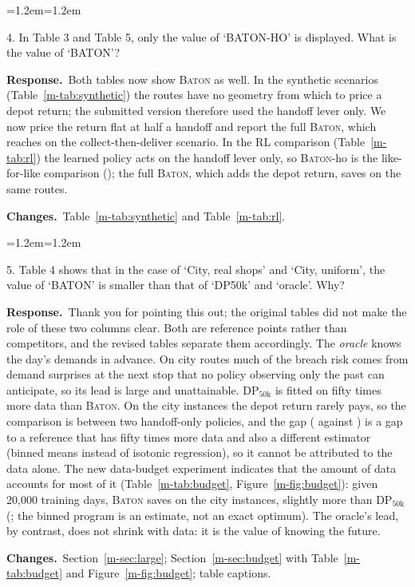 \documentclass[11pt]{article}
\newenvironment{comment}{\par\medskip\noindent\color{rev}\itshape
  \begin{list}{}{\leftmargin=1.2em\rightmargin=1.2em}\item[]}%
  {\end{list}\par}
\newcommand{\resp}{\par\noindent\textbf{Response.}\ }
\newcommand{\chg}{\par\noindent\textbf{Changes.}\ }
\newcommand{\sref}[1]{Section~\ref{m-#1}}
\newcommand{\tref}[1]{Table~\ref{m-#1}}
\newcommand{\fref}[1]{Figure~\ref{m-#1}}
\newcommand{\BATON}{\textsc{Baton}}
\begin{document}
\begin{comment}
4. In Table 3 and Table 5, only the value of `BATON-HO' is displayed.
What is the value of `BATON'?
\end{comment}
\resp Both tables now show \BATON{} as well. In the synthetic scenarios
(\tref{tab:synthetic}) the routes have no geometry from which to price a
depot return; the submitted version therefore used the handoff lever
only. We now price the return flat at half a handoff and report the full
\BATON, which reaches \ctdBatonFull{} on the collect-then-deliver
scenario. In the RL comparison (\tref{tab:rl}) the learned policy acts
on the handoff lever only, so \BATON-ho is the like-for-like comparison
(\rlBatonHo); the full \BATON, which adds the depot return, saves
\rlBaton{} on the same routes.
\chg \tref{tab:synthetic} and \tref{tab:rl}.

\begin{comment}
5. Table 4 shows that in the case of `City, real shops' and `City,
uniform', the value of `BATON' is smaller than that of `DP50k' and
`oracle'. Why?
\end{comment}
\resp Thank you for pointing this out; the original tables did not make
the role of these two columns clear. Both are reference points rather
than competitors, and the revised tables separate them accordingly. The
\emph{oracle} knows the day's demands in advance. On city routes much of
the breach risk comes from demand surprises at the next stop that no
policy observing only the past can anticipate, so its lead is large and
unattainable. DP$_{50\mathrm{k}}$ is fitted on fifty times more data
than \BATON. On the city instances the depot return rarely pays, so the
comparison is between two handoff-only policies, and the gap
(\svCityBaton{} against \svCityDp) is a gap to a reference that has
fifty times more data and also a different estimator (binned means
instead of isotonic regression), so it cannot be attributed to the data
alone. The new data-budget experiment indicates that the amount of data
accounts for most of it (\tref{tab:budget}, \fref{fig:budget}): given
20{,}000 training days, \BATON{} saves \budCityLarge{} on the city
instances, slightly more than DP$_{50\mathrm{k}}$ (\budCityDp; the
binned program is an estimate, not an exact optimum). The oracle's lead, by contrast, does not shrink with
data: it is the value of knowing the future.
\chg \sref{sec:large}; \sref{sec:budget} with \tref{tab:budget} and
\fref{fig:budget}; table captions.

\end{document}
